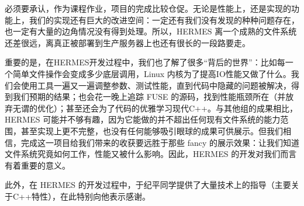 \documentclass{ctexart}
\begin{document}
必须要承认，作为课程作业，项目的完成比较仓促。无论是性能上，还是实现的功能上，我们的实现还有巨大的改进空间：一定还有我们没有发现的种种问题存在，也一定有大量的边角情况没有得到处理。所以，HERMES 离一个成熟的文件系统还差很远，离真正被部署到生产服务器上也还有很长的一段路要走。

重要的是，在HERMES开发过程中，我们也了解了很多“背后的世界”：比如每一个简单文件操作会变成多少底层调用，Linux 内核为了提高IO性能又做了什么。我们会使用工具一遍又一遍调整参数、测试性能，直到代码中隐藏的问题被解决，得到我们预期的结果；也会花一晚上追踪 FUSE 的源码，找到性能瓶颈所在（并放弃无谓的优化）；甚至还会为了代码的优雅学习现代C++。与其他组的成果相比，HERMES 可能并不够有趣，因为它能做的并不超出任何现有文件系统的能力范围，甚至实现上更不完整，也没有任何能够吸引眼球的成果可供展示。但我们相信，完成这一项目给我们带来的收获要远胜于那些 fancy 的展示效果：让我们知道文件系统究竟如何工作，性能又被什么影响。因此，HERMES 的开发对我们而言有着重要的意义。

此外，在 HERMES 的开发过程中，于纪平同学提供了大量技术上的指导（主要关于C++特性），在此特别向他表示感谢。
\end{document}
